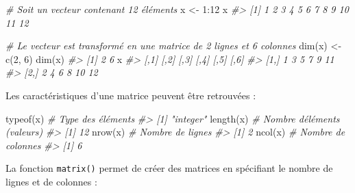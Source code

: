 \documentclass[
  french,
]{scrbook}
\newenvironment{Shaded}{\begin{snugshade}}{\end{snugshade}}
\newcommand{\CommentTok}[1]{\textcolor[rgb]{0.56,0.35,0.01}{\textit{#1}}}
\newcommand{\DecValTok}[1]{\textcolor[rgb]{0.00,0.00,0.81}{#1}}
\newcommand{\FunctionTok}[1]{\textcolor[rgb]{0.00,0.00,0.00}{#1}}
\newcommand{\NormalTok}[1]{#1}
\newcommand{\OtherTok}[1]{\textcolor[rgb]{0.56,0.35,0.01}{#1}}
\newcommand{\SpecialCharTok}[1]{\textcolor[rgb]{0.00,0.00,0.00}{#1}}
\begin{document}
\begin{Shaded}
\begin{Highlighting}[]
\CommentTok{\# Soit un vecteur contenant 12 éléments}
\NormalTok{x }\OtherTok{\textless{}{-}} \DecValTok{1}\SpecialCharTok{:}\DecValTok{12}
\NormalTok{x}
\CommentTok{\#\textgreater{}  [1]  1  2  3  4  5  6  7  8  9 10 11 12}

\CommentTok{\# Le vecteur est transformé en une matrice de 2 lignes et 6 colonnes}
\FunctionTok{dim}\NormalTok{(x) }\OtherTok{\textless{}{-}} \FunctionTok{c}\NormalTok{(}\DecValTok{2}\NormalTok{, }\DecValTok{6}\NormalTok{)}
\FunctionTok{dim}\NormalTok{(x)}
\CommentTok{\#\textgreater{} [1] 2 6}
\NormalTok{x}
\CommentTok{\#\textgreater{}      [,1] [,2] [,3] [,4] [,5] [,6]}
\CommentTok{\#\textgreater{} [1,]    1    3    5    7    9   11}
\CommentTok{\#\textgreater{} [2,]    2    4    6    8   10   12}
\end{Highlighting}
\end{Shaded}

Les caractéristiques d'une matrice peuvent être retrouvées :

\begin{Shaded}
\begin{Highlighting}[]
\FunctionTok{typeof}\NormalTok{(x) }\CommentTok{\# Type des éléments}
\CommentTok{\#\textgreater{} [1] "integer"}
\FunctionTok{length}\NormalTok{(x) }\CommentTok{\# Nombre d\textquotesingle{}éléments (valeurs)}
\CommentTok{\#\textgreater{} [1] 12}
\FunctionTok{nrow}\NormalTok{(x)   }\CommentTok{\# Nombre de lignes}
\CommentTok{\#\textgreater{} [1] 2}
\FunctionTok{ncol}\NormalTok{(x)   }\CommentTok{\# Nombre de colonnes}
\CommentTok{\#\textgreater{} [1] 6}
\end{Highlighting}
\end{Shaded}

La fonction \texttt{matrix()} permet de créer des matrices en spécifiant le nombre de lignes et de colonnes :
\end{document}

